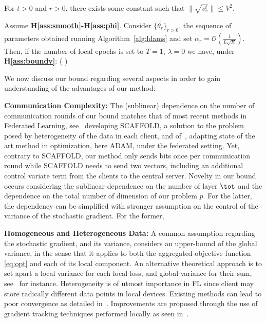 \documentclass[11pt]{article}
\begin{document}
\begin{assumption}\label{ass:boundv}
For $t >0$ and $r>0$, there exists some constant such that $\| \sqrt{ v_r^t} \| \leq V^2 $.
\end{assumption}

\begin{Corollary}\label{coro:main}
Assume \textbf{H\ref{ass:smooth}-H\ref{ass:phi}}. Consider $\{\overline{\theta_r}\}_{r>0}$, the sequence of parameters obtained running Algorithm~\ref{alg:ldams} and set $\alpha_r = \mathcal{O}(\frac{1}{L \sqrt{R}})$. Then, if the number of local epochs is set to $T=1$, $\lambda = 0$ we have, under \textbf{H\ref{ass:boundv}}:
\beq \label{bound1coro}
 \EE{} \leq {}\left(  \right)
\eeq
\end{Corollary}


We now discuss our bound regarding several aspects in order to gain understanding of the advantages of our method:

\textbf{Communication Complexity:} The (sublinear) dependence on the number of communication rounds of our bound matches that of most recent methods in Federated Learning, see~\citep{karimireddy2019scaffold} developing SCAFFOLD, a solution to the problem posed by heterogeneity of the data in each client, and of~\citep{reddi2020adaptive}, adapting state of the art method in optimization, here ADAM, under the federated setting. 
Yet, contrary to SCAFFOLD, our method only sends bits once per communication round while SCAFFOLD needs to send two vectors, including an additional control variate term  from the clients to the central server.
Novelty in our bound occurs considering the sublinear dependence on the number of layer $\tot$ and the dependence on the total number of dimension of our problem $p$. For the latter, the dependency can be simplified with stronger assumption on the control of the variance of the stochastic gradient. For the former, 


\textbf{Homogeneous and Heterogeneous Data:} A common assumption regarding the stochastic gradient, and its variance, considers an upper-bound of the global variance, in the sense that it applies to both the aggregated objective function \eqref{eq:opt} and each of its local component. 
An alternative theoretical approach is to set apart a local variance for each local loss, and global variance for their sum, see~\citep{chen2020toward} for instance.
Heterogeneity is of utmost importance in FL since client may store radically different data points in local devices.
Existing methods can lead to poor convergence as detailed in~\citep{li2019federated,liang2019variance}. 
Improvements are proposed through the use of gradient tracking techniques performed locally as seen in~\citep{haddadpour2020federated,horvath2019stochastic,karimireddy2019scaffold}.
\end{document}
